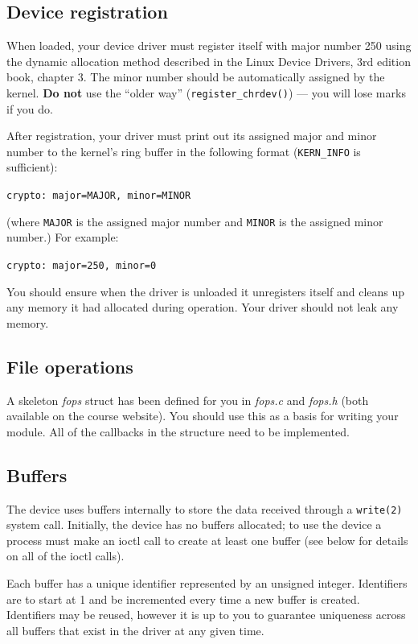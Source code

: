 \documentclass[12pt,a4paper]{article}
\begin{document}
\subsection*{Device registration}

When loaded, your device driver must register itself with major number 250 using
the dynamic allocation method described in the Linux Device Drivers, 3rd
edition book, chapter 3. The minor number should be automatically assigned by
the kernel. \textbf{Do not} use the ``older way'' (\texttt{register\_chrdev()})
--- you will lose marks if you do.

After registration, your driver must print out its assigned major and minor
number to the kernel's ring buffer in the following format (\texttt{KERN\_INFO}
is sufficient):

\texttt{crypto: major=MAJOR, minor=MINOR}

(where \texttt{MAJOR} is the assigned major number and \texttt{MINOR} is the
assigned minor number.) For example:

\texttt{crypto: major=250, minor=0}

You should ensure when the driver is unloaded it unregisters itself and cleans
up any memory it had allocated during operation. Your driver should not leak
any memory.

\subsection*{File operations}

A skeleton \textit{fops} struct has been defined for you in \textit{fops.c} and
\textit{fops.h} (both available on the course website). You should use this as
a basis for writing your module. All of the callbacks in the structure need to
be implemented.

\subsection*{Buffers}

The device uses buffers internally to store the data received through a
\texttt{write(2)} system call. Initially, the device has no buffers allocated;
to use the device a process must make an ioctl call to create at least one
buffer (see below for details on all of the ioctl calls). 

Each buffer has a unique identifier represented by an unsigned integer.
Identifiers are to start at 1 and be incremented every time a new buffer is
created. Identifiers may be reused, however it is up to you to guarantee
uniqueness across all buffers that exist in the driver at any given time.
\end{document}
